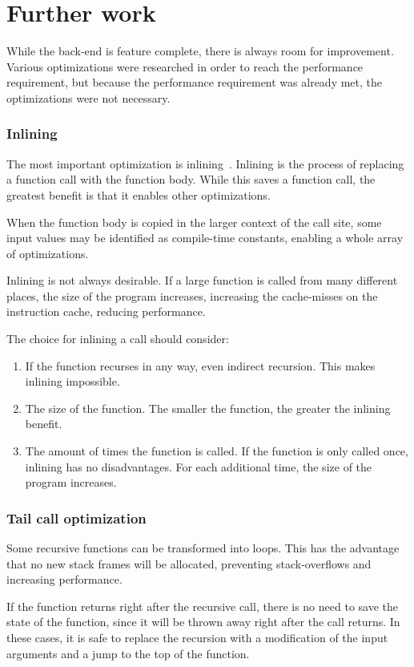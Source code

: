 \section{Further work}\label{recommendations}
While the back-end is feature complete, there is always room for improvement.
Various optimizations were researched in order to reach the performance requirement, but
because the performance requirement was already met, the optimizations were not necessary.

\subsubsection{Inlining}
The most important optimization is inlining~\cite{inlining}.
Inlining is the process of replacing a function call with the function body.
While this saves a function call, the greatest benefit is that it enables other optimizations.

When the function body is copied in the larger context of the call site, some input values may be identified as compile-time constants, enabling a whole array of optimizations. 

Inlining is not always desirable.
If a large function is called from many different places, the size of the program increases, increasing the cache-misses on the instruction cache, reducing performance.

The choice for inlining a call should consider:
\begin{enumerate}
    \item If the function recurses in any way, even indirect recursion.
        This makes inlining impossible.
    \item The size of the function.
        The smaller the function, the greater the inlining benefit.
    \item The amount of times the function is called.
        If the function is only called once, inlining has no disadvantages.
        For each additional time, the size of the program increases.
\end{enumerate}

\subsubsection{Tail call optimization}
Some recursive functions can be transformed into loops.
This has the advantage that no new stack frames will be allocated, preventing stack-overflows and increasing performance.

If the function returns right after the recursive call, there is no need to save the state of the function, since it will be thrown away right after the call returns.
In these cases, it is safe to replace the recursion with a modification of the input arguments and a jump to the top of the function.

